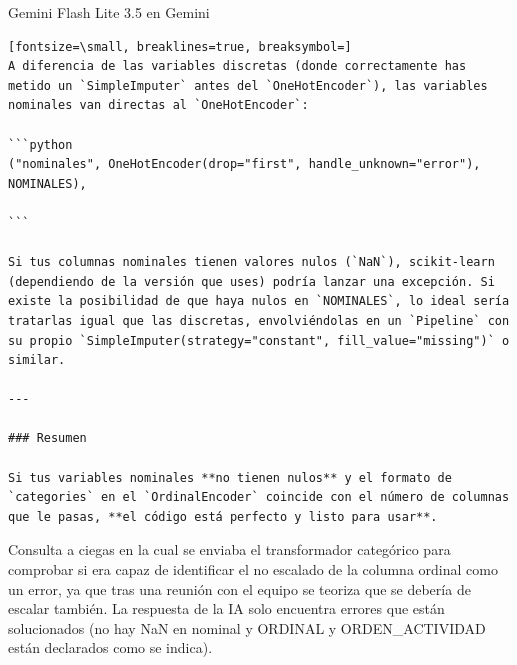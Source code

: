 \documentclass[12pt,a4paper,oneside]{book}
\begin{document}
\begin{iaresp}{Gemini Flash Lite 3.5 en Gemini}
\begin{Verbatim}[fontsize=\small, breaklines=true, breaksymbol=]
A diferencia de las variables discretas (donde correctamente has metido un `SimpleImputer` antes del `OneHotEncoder`), las variables nominales van directas al `OneHotEncoder`:

```python
("nominales", OneHotEncoder(drop="first", handle_unknown="error"), NOMINALES),

```

Si tus columnas nominales tienen valores nulos (`NaN`), scikit-learn (dependiendo de la versión que uses) podría lanzar una excepción. Si existe la posibilidad de que haya nulos en `NOMINALES`, lo ideal sería tratarlas igual que las discretas, envolviéndolas en un `Pipeline` con su propio `SimpleImputer(strategy="constant", fill_value="missing")` o similar.

---

### Resumen

Si tus variables nominales **no tienen nulos** y el formato de `categories` en el `OrdinalEncoder` coincide con el número de columnas que le pasas, **el código está perfecto y listo para usar**.
\end{Verbatim}
\end{iaresp}
\begin{iaanalisis}
Consulta a ciegas en la cual se enviaba el transformador categórico para comprobar si era capaz de identificar el no escalado de la columna ordinal como un error, ya que tras una reunión con el equipo se teoriza que se debería de escalar también. La respuesta de la IA solo encuentra errores que están solucionados (no hay NaN en nominal y ORDINAL y ORDEN\_ACTIVIDAD están declarados como se indica).
\end{iaanalisis}
\end{document}
